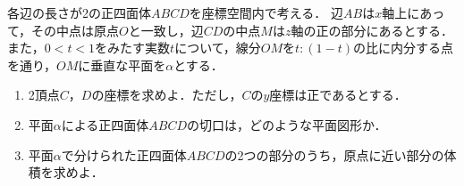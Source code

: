 \documentclass[../../main.tex]{subfiles}
\begin{document}
各辺の長さが2の正四面体$ABCD$を座標空間内で考える．
辺$AB$は$x$軸上にあって，その中点は原点$O$と一致し，辺$CD$の中点$M$は$z$軸の正の部分にあるとする．
また，$0<t<1$をみたす実数$t$について，線分$OM$を$t:(1-t)$の比に内分する点を通り，$OM$に垂直な平面を$\alpha$とする．
\begin{enumerate}
  \item 2頂点$C$，$D$の座標を求めよ．ただし，$C$の$y$座標は正であるとする．
  \item 平面$\alpha$による正四面体$ABCD$の切口は，どのような平面図形か．
  \item 平面$\alpha$で分けられた正四面体$ABCD$の2つの部分のうち，原点に近い部分の体積を求めよ．
\end{enumerate}
\end{document}

